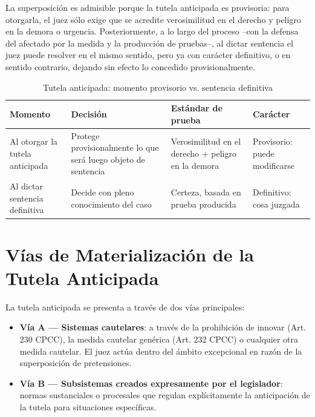 \documentclass[12pt,oneside]{book}
\begin{document}
La superposición es admisible porque la tutela anticipada es provisoria: para otorgarla, el juez sólo exige que se acredite verosimilitud en el derecho y peligro en la demora o urgencia. Posteriormente, a lo largo del proceso --con la defensa del afectado por la medida y la producción de pruebas--, al dictar sentencia el juez puede resolver en el mismo sentido, pero ya con carácter definitivo, o en sentido contrario, dejando sin efecto lo concedido provisionalmente.

\begin{table}[H]
\centering
\caption{Tutela anticipada: momento provisorio vs. sentencia definitiva}
\begin{tabularx}{\textwidth}{>{\raggedright\arraybackslash}p{} >{\raggedright\arraybackslash}p{} >{\raggedright\arraybackslash}p{} >{\raggedright\arraybackslash}X}
\toprule
\textbf{Momento} & \textbf{Decisión} & \textbf{Estándar de prueba} & \textbf{Carácter} \\
\midrule
Al otorgar la tutela anticipada & Protege provisionalmente lo que será luego objeto de sentencia & Verosimilitud en el derecho + peligro en la demora & Provisorio: puede modificarse \\
Al dictar sentencia definitiva & Decide con pleno conocimiento del caso & Certeza, basada en prueba producida & Definitivo: cosa juzgada \\
\bottomrule
\end{tabularx}
\end{table}

\section{Vías de Materialización de la Tutela Anticipada}

La tutela anticipada se presenta a través de dos vías principales:

\begin{itemize}
    \item \textbf{Vía A --- Sistemas cautelares}: a través de la prohibición de innovar (Art. 230 CPCC), la medida cautelar genérica (Art. 232 CPCC) o cualquier otra medida cautelar. El juez actúa dentro del ámbito excepcional en razón de la superposición de pretensiones.
    \item \textbf{Vía B --- Subsistemas creados expresamente por el legislador}: normas sustanciales o procesales que regulan explícitamente la anticipación de la tutela para situaciones específicas.
\end{itemize}
\end{document}
